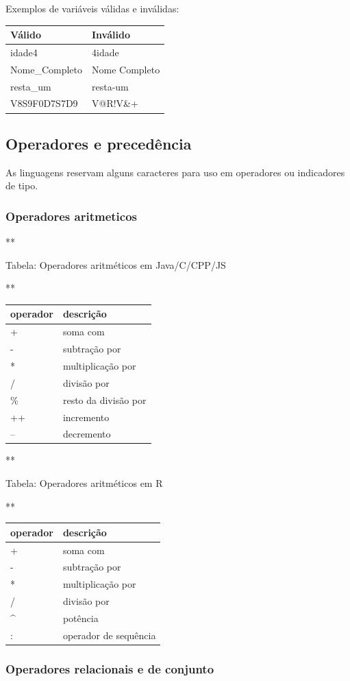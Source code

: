 \documentclass[12pt,a4paper]{article}
\begin{document}
    Exemplos de variáveis válidas e inválidas:

\begin{longtable}[]{@{}ll@{}}
\toprule
Válido & Inválido\tabularnewline
\midrule
\endhead
idade4 & 4idade\tabularnewline
Nome\_Completo & Nome Completo\tabularnewline
resta\_um & resta-um\tabularnewline
V8S9F0D7S7D9 & V@R!V\&+\tabularnewline
\bottomrule
\end{longtable}

    \hypertarget{operadores-e-preceduxeancia}{%
\subsection{Operadores e
precedência}\label{operadores-e-preceduxeancia}}

    As linguagens reservam alguns caracteres para uso em operadores ou
indicadores de tipo.

    \hypertarget{operadores-aritmeticos}{%
\subsubsection{Operadores aritmeticos}\label{operadores-aritmeticos}}

    **

Tabela: Operadores aritméticos em Java/C/CPP/JS

**

\begin{longtable}[]{@{}ll@{}}
\toprule
operador & descrição\tabularnewline
\midrule
\endhead
+ & soma com\tabularnewline
- & subtração por\tabularnewline
* & multiplicação por\tabularnewline
/ & divisão por\tabularnewline
\% & resto da divisão por\tabularnewline
++ & incremento\tabularnewline
-- & decremento\tabularnewline
\bottomrule
\end{longtable}

    **

Tabela: Operadores aritméticos em R

**

\begin{longtable}[]{@{}ll@{}}
\toprule
operador & descrição\tabularnewline
\midrule
\endhead
+ & soma com\tabularnewline
- & subtração por\tabularnewline
* & multiplicação por\tabularnewline
/ & divisão por\tabularnewline
\^{} & potência\tabularnewline
: & operador de sequência\tabularnewline
\bottomrule
\end{longtable}

    \hypertarget{operadores-relacionais-e-de-conjunto}{%
\subsubsection{Operadores relacionais e de
conjunto}\label{operadores-relacionais-e-de-conjunto}}
\end{document}
